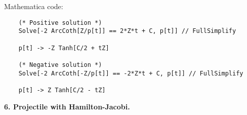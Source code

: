 \documentclass{article}
\theoremstyle{definition}
\begin{document}
\begin{enumerate}[label=(\alph*)]
	Mathematica code:
	\begin{lstlisting}
	(* Positive solution *)
	Solve[-2 ArcCoth[Z/p[t]] == 2*Z*t + C, p[t]] // FullSimplify
	
	p[t] -> -Z Tanh[C/2 + tZ]
	
	(* Negative solution *)
	Solve[-2 ArcCoth[-Z/p[t]] == -2*Z*t + C, p[t]] // FullSimplify
	
	p[t] -> Z Tanh[C/2 - tZ]
	\end{lstlisting}
	
\end{enumerate}




\noindent \textbf{6. Projectile with Hamilton-Jacobi.}
 
 
\end{document}
